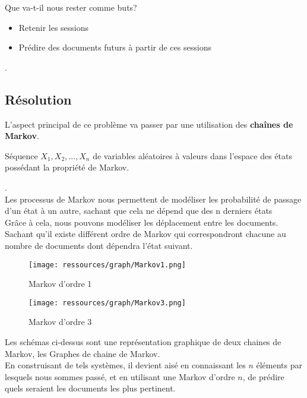             Que va-t-il nous rester comme buts?
            \begin{itemize}
                \item Retenir les sessions
                \item Prédire des documents futurs à partir de ces sessions
            \end{itemize}.\\
        \subsection{Résolution}
            L'aspect principal de ce problème va passer par une utilisation des \textbf{chaînes de Markov}.\\
            \begin{center}
                Séquence $X_1, X_2, \ldots , X_n$ de variables aléatoires à valeurs dans l’espace des états possédant la propriété de Markov.
            \end{center}.\\

            Les processus de Markov nous permettent de modéliser les probabilité de passage d'un état à un autre, sachant que cela ne dépend que des n derniers états\\
            Grâce à cela, nous pouvons modéliser les déplacement entre les documents. Sachant qu'il existe différent ordre de Markov qui correspondront chacune au nombre de documents dont dépendra l'état suivant.\\

            \begin{figure}[h]
               \centering
               \texttt{[image: ressources/graph/Markov1.png]}
               \caption{Markov d'ordre 1}
            \end{figure}
            \begin{figure}[h]
               \centering
               \texttt{[image: ressources/graph/Markov3.png]}
               \caption{Markov d'ordre 3}
            \end{figure}

            Les schémas ci-dessus sont une représentation graphique de deux chaines de Markov, les Graphes de chaine de Markov.\\
            En construisant de tels systèmes, il devient aisé en connaissant les $n$ éléments par lesquels nous sommes passé, et en utilisant une Markov d'ordre $n$, de prédire quels seraient les documents les plus pertinent.\\

